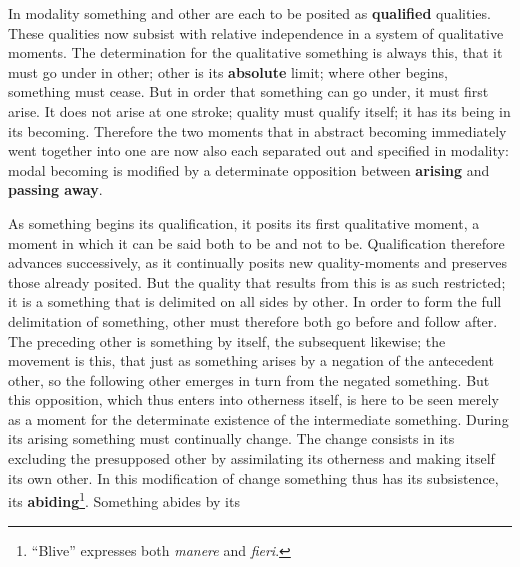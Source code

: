 \documentclass[12pt,a4paper,openany]{book}
\newcommand{\opage}[1]{\marginnote{\footnotesize\textit{[#1]}}}
\begin{document}
In modality something and other are each to be posited as \textbf{qualified} qualities. These qualities now subsist with relative independence in a system of qualitative moments. The determination for the qualitative something is always this, that it must go
\setcounter{footnote}{0}%
\opage{56}under in other; other is its \textbf{absolute} limit; where other begins, something must cease. But in order that something can go under, it must first arise. It does not arise at one stroke; quality must qualify itself; it has its being in its becoming. Therefore the two moments that in abstract becoming immediately went together into one are now also each separated out and specified in modality: modal becoming is modified by a determinate opposition between \textbf{arising} and \textbf{passing away}.

As something begins its qualification, it posits its first qualitative moment, a moment in which it can be said both to be and not to be. Qualification therefore advances successively, as it continually posits new quality-moments and preserves those already posited. But the quality that results from this is as such restricted; it is a something that is delimited on all sides by other. In order to form the full delimitation of something, other must therefore both go before and follow after. The preceding other is something by itself, the subsequent likewise; the movement is this, that just as something arises by a negation of the antecedent other, so the following other emerges in turn from the negated something. But this opposition, which thus enters into otherness itself, is here to be seen merely as a moment for the determinate existence of the intermediate something. During its arising something must continually change. The change consists in its excluding the presupposed other by assimilating its otherness and making itself its own other. In this modification of change something thus has its subsistence, its \textbf{abiding}\footnote{``Blive'' expresses both \textit{manere} and \textit{fieri}.}. Something abides by its
\setcounter{footnote}{0}%
\end{document}
